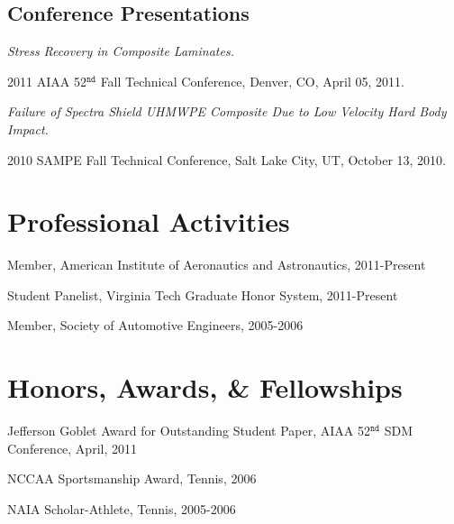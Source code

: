 \documentclass[10pt,letterpaper]{article}
\renewenvironment{itemize}{
  \begin{list}{}{
    \setlength{\leftmargin}{1.5em}
    \setlength{\itemsep}{0.25em}
    \setlength{\parskip}{0pt}
    \setlength{\parsep}{0.25em}
  }
}{
  \end{list}
}
\begin{document}
\subsection*{Conference Presentations}
\begin{itemize}
\item \textit{Stress Recovery in Composite Laminates.}
  \begin{itemize}
  \item 2011 AIAA 52$^{\texttt{nd}}$ Fall Technical Conference,
    Denver, CO,
    April 05, 2011.
  \end{itemize}
\item \textit{Failure of Spectra Shield UHMWPE Composite Due to Low Velocity Hard Body Impact.}
  \begin{itemize}
  \item 2010 SAMPE Fall Technical Conference,
    Salt Lake City, UT,
    October 13, 2010.
  \end{itemize}
\end{itemize}

%
%

\section*{Professional Activities}
\begin{itemize}
\item Member, American Institute of Aeronautics and Astronautics, 2011-Present
\item Student Panelist, Virginia Tech Graduate Honor System, 2011-Present
\item Member, Society of Automotive Engineers, 2005-2006
\end{itemize}

\section*{Honors, Awards, \& Fellowships}

\begin{itemize}
\item Jefferson Goblet Award for Outstanding Student Paper, AIAA 52$^{\texttt{nd}}$ SDM Conference, April, 2011
\item NCCAA Sportsmanship Award, Tennis, 2006
\item NAIA Scholar-Athlete, Tennis, 2005-2006
\end{itemize}
\end{document}
